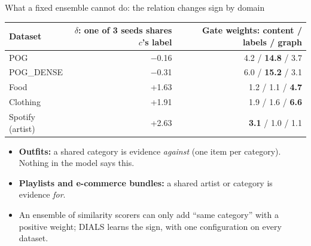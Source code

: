 \documentclass[10pt,aspectratio=169]{beamer}
\newcommand{\key}[1]{\textcolor{Accent}{\textbf{#1}}}
\begin{document}
\begin{frame}{What a fixed ensemble cannot do: the relation changes sign by domain}
\centering\renewcommand{\arraystretch}{1.25}
\begin{tabular}{lrr}\toprule
Dataset & $\delta$: one of 3 seeds shares $c$'s label & Gate weights: content / labels / graph\\\midrule
POG & \textcolor{Warn}{$-$0.16} & 4.2 / \textbf{14.8} / 3.7\\
POG\_DENSE & \textcolor{Warn}{$-$0.31} & 6.0 / \textbf{15.2} / 3.1\\
Food & +1.63 & 1.2 / 1.1 / \textbf{4.7}\\
Clothing & +1.91 & 1.9 / 1.6 / \textbf{6.6}\\
Spotify (artist) & +2.63 & \textbf{3.1} / 1.0 / 1.1\\\bottomrule
\end{tabular}\par
\raggedright\vspace{3mm}
\begin{itemize}\setlength\itemsep{2pt}
\item \key{Outfits:} a shared category is evidence \emph{against} (one item per category). Nothing in the model says this.
\item \key{Playlists and e-commerce bundles:} a shared artist or category is evidence \emph{for}.
\item An ensemble of similarity scorers can only add ``same category'' with a positive weight; DIALS learns the sign, with one configuration on every dataset.
\end{itemize}
\end{frame}
\end{document}
